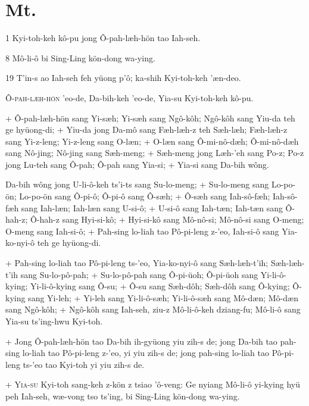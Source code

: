 \setcounter{page}{1}


\section{Mt.}%

\begin{sAbstract}
	\item[1] Kyi-toh-keh kô-pu jong Ô-pah-læh-hön tao Iah-seh.
	\item[8] Mô-li-ô bi Sing-Ling kön-dong wa-ying.
	\item[19] T'in-s ao Iah-seh feh yüong p'ô; ka-shih Kyi-toh-keh 'æn-deo.
\end{sAbstract}

\header
\lettrine{Ô}{-pah-læh-hön} 'eo-de, Da-bih-keh 'eo-de, Yia-su Kyi-toh-keh kô-pu.
\par
\hspace{1ex}
+	Ô-pah-læh-hön sang Yi-sæh; Yi-sæh sang Ngô-kôh; Ngô-kôh sang Yiu-da teh ge hyüong-di;
+	Yiu-da jong Da-mô sang Fæh-læh-z teh Sæh-læh; Fæh-læh-z sang Yi-z-leng; Yi-z-leng sang O-læn;
+	O-læn sang Ô-mi-nô-dæh; Ô-mi-nô-dæh sang Nô-jing; Nô-jing sang Sæh-meng;
+	Sæh-meng jong Læh-'eh sang Po-z; Po-z jong Lu-teh sang Ô-pah; Ô-pah sang Yia-si;
+	Yia-si sang Da-bih wông. \par Da-bih wông jong U-li-ô-keh ts'i-ts sang Su-lo-meng;
+	Su-lo-meng sang Lo-po-ön; Lo-po-ön sang Ô-pi-ô; Ô-pi-ô sang Ô-sæh;
+	Ô-sæh sang Iah-sô-fæh; Iah-sô-fæh sang Iah-læn; Iah-læn sang U-si-ô;
+	U-si-ô sang Iah-tæn; Iah-tæn sang Ô-hah-z; Ô-hah-z sang Hyi-si-kô;
+	Hyi-si-kô sang Mô-nô-si; Mô-nô-si sang O-meng; O-meng sang Iah-si-ô;
+	Pah-sing lo-liah tao Pô-pi-leng z-'eo, Iah-si-ô sang Yia-ko-nyi-ô teh ge hyüong-di.
\par
+	Pah-sing lo-liah tao Pô-pi-leng ts-'eo, Yia-ko-nyi-ô sang Sæh-læh-t'ih; Sæh-læh-t'ih sang Su-lo-pô-pah;
+	Su-lo-pô-pah sang Ô-pi-üoh; Ô-pi-üoh sang Yi-li-ô-kying; Yi-li-ô-kying sang Ô-su;
+	Ô-su sang Sæh-dôh; Sæh-dôh sang Ô-kying; Ô-kying sang Yi-leh;
+	Yi-leh sang Yi-li-ô-sæh; Yi-li-ô-sæh sang Mô-dæn; Mô-dæn sang Ngô-kôh;
+	Ngô-kôh sang Iah-seh, ziu-z Mô-li-ô-keh dziang-fu; Mô-li-ô sang Yia-su ts'ing-hwu Kyi-toh.
\par
+	Jong Ô-pah-læh-hön tao Da-bih ih-gyüong yiu zih-s de; jong Da-bih tao pah-sing lo-liah tao Pô-pi-leng z-'eo, yi yiu zih-s de; jong pah-sing lo-liah tao Pô-pi-leng ts-'eo tao Kyi-toh yi yiu zih-s de.
\par
+	\textsc{Yia-su} Kyi-toh sang-keh z-kön z tsiao 'ô-veng: Ge nyiang Mô-li-ô yi-kying hyü peh Iah-seh, wæ-vong tso ts'ing, bi Sing-Ling kön-dong wa-ying.
